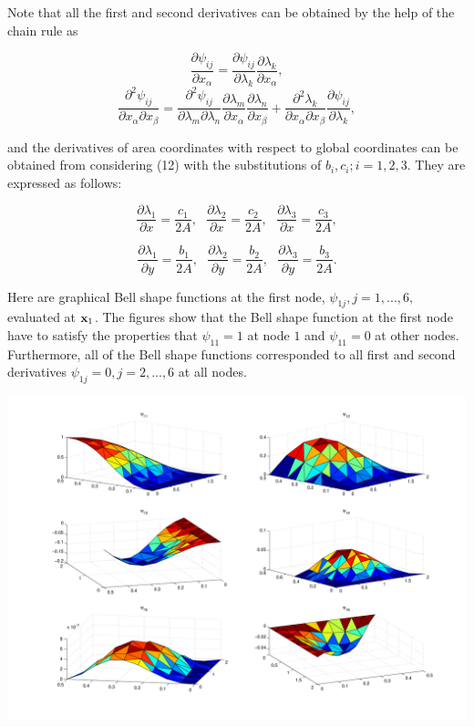 Note that all the first and second derivatives can be obtained by the help of the chain rule as

\[ \frac{\partial \psi_{ij}}{\partial x_{\alpha}} = \frac{\partial \psi_{ij}}{\partial \lambda_{k}}\frac{\partial \lambda_{k}}{\partial x_{\alpha}}, \] \[ \frac{\partial^2 \psi_{ij}}{\partial x_{\alpha}\partial x_{\beta}} = \frac{\partial^2 \psi_{ij}}{\partial \lambda_{m}\partial \lambda_{n}}\frac{\partial \lambda_{m}}{\partial x_{\alpha}}\frac{\partial \lambda_{n}}{\partial x_{\beta}} + \frac{\partial^2 \lambda_{k}}{\partial x_{\alpha}\partial x_{\beta}}\frac{\partial \psi_{ij}}{\partial \lambda_{k}}, \]

and the derivatives of area coordinates with respect to global coordinates can be obtained from considering (12) with the substitutions of $ b_i, c_i; i=1,2,3. $ They are expressed as follows\+:

\[ \frac{\partial \lambda_{1}}{\partial x} = \frac{c_1}{2A}, \ \ \ \frac{\partial \lambda_{2}}{\partial x} = \frac{c_2}{2A}, \ \ \ \frac{\partial \lambda_{3}}{\partial x} = \frac{c_3}{2A}, \]

\[ \frac{\partial \lambda_{1}}{\partial y} = \frac{b_1}{2A}, \ \ \ \frac{\partial \lambda_{2}}{\partial y} = \frac{b_2}{2A}, \ \ \ \frac{\partial \lambda_{3}}{\partial y} = \frac{b_3}{2A}. \]

Here are graphical Bell shape functions at the first node, $ \psi_{1j}, j=1,...,6,$ evaluated at $ {\bf x}_1 $. The figures show that the Bell shape function at the first node have to satisfy the properties that $\psi_{11} = 1$ at node $1$ and $\psi_{11} = 0$ at other nodes. Furthermore, all of the Bell shape functions corresponded to all first and second derivatives $ \psi_{1j} = 0, j=2,...,6 $ at all nodes.

 
\begin{DoxyImage}
\includegraphics[width=1.05\textwidth]{shapes}
\end{DoxyImage}


